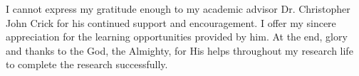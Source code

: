 \begin{acknowledgementspage}
I cannot express my gratitude enough to my academic advisor Dr. Christopher John Crick for his continued support and encouragement. I offer my sincere appreciation for the learning opportunities provided by him.
At the end, glory and thanks to the God, the Almighty, for His helps throughout my research life to complete the research successfully.
\end{acknowledgementspage}
